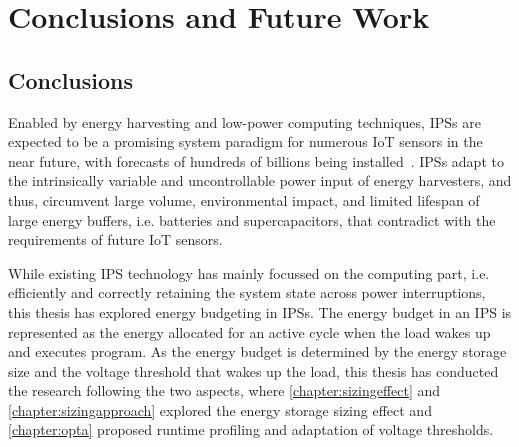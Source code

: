 \chapter{Conclusions and Future Work} \label{chapter:conclusion}

\section{Conclusions}

Enabled by energy harvesting and low-power computing techniques, IPSs are expected to be a promising system paradigm for numerous IoT sensors in the near future, with forecasts of hundreds of billions being installed~\cite{sparks2017trillion}.
IPSs adapt to the intrinsically variable and uncontrollable power input of energy harvesters, and thus, circumvent large volume, environmental impact, and limited lifespan of large energy buffers, i.e. batteries and supercapacitors, that contradict with the requirements of future IoT sensors.

While existing IPS technology has mainly focussed on the computing part, i.e. efficiently and correctly retaining the system state across power interruptions, this thesis has explored energy budgeting in IPSs. 
The energy budget in an IPS is represented as the energy allocated for an active cycle when the load wakes up and executes program. 
As the energy budget is determined by the energy storage size and the voltage threshold that wakes up the load, this thesis has conducted the research following the two aspects, where \cref{chapter:sizingeffect} and \cref{chapter:sizingapproach} explored the energy storage sizing effect and \cref{chapter:opta} proposed runtime profiling and adaptation of voltage thresholds. 

